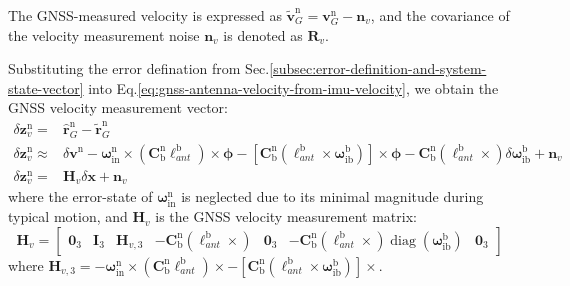 \documentclass{article}
\begin{document}
The GNSS-measured velocity is expressed as $\tilde{\boldsymbol{v}}_{G}^{\mathrm{n}} = \boldsymbol{v}_{G}^{\mathrm{n}} - \boldsymbol{n}_{v}$, and the covariance of the velocity measurement noise $\boldsymbol{n}_{v}$ is denoted as $\boldsymbol{R}_{v}$.

Substituting the error defination from Sec.\ref{subsec:error-definition-and-system-state-vector} into Eq.\eqref{eq:gnss-antenna-velocity-from-imu-velocity}, we obtain the GNSS velocity measurement vector:
\begin{equation}
    \begin{aligned}
    \delta \boldsymbol{z}_{v}^{\mathrm{n}} =& \hat{\boldsymbol{r}}_{G}^{\mathrm{n}} - \tilde{\boldsymbol{r}}_{G}^{\mathrm{n}} \\
    \delta \boldsymbol{z}_{v}^{\mathrm{n}} \approx& \delta \boldsymbol{v}^{\mathrm{n}} - \boldsymbol{\omega}_{\mathrm{in}}^{\mathrm{n}}\times \left(\mathbf{C}_{\mathrm{b}}^{\mathrm{n}} \boldsymbol{\ell}_{ant}^{\mathrm{b}}\right)\times \boldsymbol{\phi} - \left[\mathbf{C}_{\mathrm{b}}^{\mathrm{n}} \left(\boldsymbol{\ell}_{ant}^{\mathrm{b}} \times \boldsymbol{\omega}_{\mathrm{ib}}^{\mathrm{b}}\right)\right]\times \boldsymbol{\phi} - \mathbf{C}_{\mathrm{b}}^{\mathrm{n}} \left(\boldsymbol{\ell}_{ant}^{\mathrm{b}} \times \right) \delta \boldsymbol{\omega}_{\mathrm{ib}}^{\mathrm{b}} + \boldsymbol{n}_{v} \\
    \delta \boldsymbol{z}_{v}^{\mathrm{n}} =& \boldsymbol{H}_{v} \delta \boldsymbol{x} + \boldsymbol{n}_{v}
    \end{aligned}
\end{equation}
where the error-state of $\boldsymbol{\omega}_{\mathrm{in}}^{\mathrm{n}}$ is neglected due to its minimal magnitude during typical motion, and $\boldsymbol{H}_{v}$ is the GNSS velocity measurement matrix:
\begin{equation}
    \boldsymbol{H}_{v} = \begin{bmatrix}
        \boldsymbol{0}_3 & \boldsymbol{I}_3 & \boldsymbol{H}_{v,3} & -\mathbf{C}_{\mathrm{b}}^{\mathrm{n}} \left(\boldsymbol{\ell}_{ant}^{\mathrm{b}} \times \right) & \boldsymbol{0}_3 & -\mathbf{C}_{\mathrm{b}}^{\mathrm{n}} \left(\boldsymbol{\ell}_{ant}^{\mathrm{b}} \times \right) \operatorname{diag}(\boldsymbol{\omega}_{\mathrm{ib}}^{\mathrm{b}}) & \boldsymbol{0}_3
    \end{bmatrix}
\end{equation}
where $\boldsymbol{H}_{v,3} = - \boldsymbol{\omega}_{\mathrm{in}}^{\mathrm{n}}\times \left(\mathbf{C}_{\mathrm{b}}^{\mathrm{n}} \boldsymbol{\ell}_{ant}^{\mathrm{b}}\right)\times  - \left[\mathbf{C}_{\mathrm{b}}^{\mathrm{n}} \left(\boldsymbol{\ell}_{ant}^{\mathrm{b}} \times \boldsymbol{\omega}_{\mathrm{ib}}^{\mathrm{b}}\right)\right]\times $.
\end{document}
